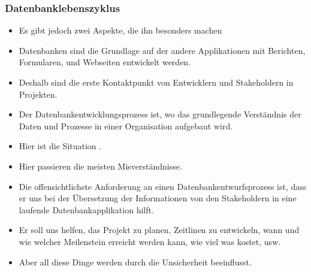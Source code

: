\documentclass[aspectratio=169,mathserif,notheorems]{beamer}%
\begin{document}
\begin{frame}%
\frametitle{Datenbanklebenszyklus}%
\begin{itemize}%
%
%
%
%
%
\item<3-> Es gibt jedoch zwei Aspekte, die ihn besonders machen%
%
\item<6-> Datenbanken sind die Grundlage auf der andere Applikationen mit Berichten, Formularen, und Webseiten entwickelt werden.%
%
\item<7-> Deshalb sind die erste Kontaktpunkt von Entwicklern und Stakeholdern in Projekten.%
%
\item<8-> Der Datenbankentwicklungsprozess ist, wo das grundlegende Verständnis der Daten und Prozesse in einer Organisation aufgebaut wird.%
%
\item<9-> Hier ist die Situation .%
%
\item<10-> Hier passieren die meisten Misverständnisse.%
%
\item<11-> Die offensichtlichste Anforderung an einen Datenbankentwurfsprozess ist, dass er uns bei der Übersetzung der Informationen von den Stakeholdern in eine laufende Datenbankapplikation hilft.%
%
\item<12-> Er soll uns helfen, das Projekt zu planen, Zeitlinen zu entwickeln, wann und wie welcher Meilenstein erreicht werden kann, wie viel was kostet, usw.%
%
\item<13-> Aber all diese Dinge werden durch die Unsicherheit beeinflusst.%
\end{itemize}%
\end{frame}%
%
\end{document}
